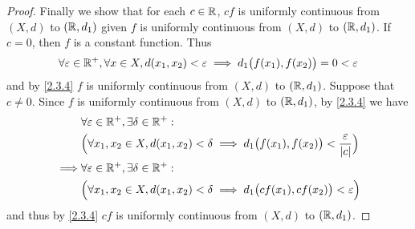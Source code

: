 \begin{proof}
  Finally we show that for each \(c \in \mathbb{R}\), \(cf\) is uniformly continuous from \((X, d)\) to \((\mathbb{R}, d_1)\) given \(f\) is uniformly continuous from \((X, d)\) to \((\mathbb{R}, d_1)\).
  If \(c = 0\), then \(f\) is a constant function.
  Thus
  \[
    \forall \varepsilon \in \mathbb{R}^+, \forall x \in X, d(x_1, x_2) < \varepsilon \implies d_1\big(f(x_1), f(x_2)\big) = 0 < \varepsilon
  \]
  and by \cref{2.3.4} \(f\) is uniformly continuous from \((X, d)\) to \((\mathbb{R}, d_1)\).
  Suppose that \(c \neq 0\).
  Since \(f\) is uniformly continuous from \((X, d)\) to \((\mathbb{R}, d_1)\), by \cref{2.3.4} we have
  \begin{align*}
             & \forall \varepsilon \in \mathbb{R}^+, \exists \delta \in \mathbb{R}^+:                                                                     \\
             & \Big(\forall x_1, x_2 \in X, d(x_1, x_2) < \delta \implies d_1\big(f(x_1), f(x_2)\big) < \dfrac{\varepsilon}{\left\lvert c\right\rvert}\Big) \\
    \implies & \forall \varepsilon \in \mathbb{R}^+, \exists \delta \in \mathbb{R}^+:                                                                     \\
             & \Big(\forall x_1, x_2 \in X, d(x_1, x_2) < \delta \implies d_1\big(cf(x_1), cf(x_2)\big) < \varepsilon\Big)
  \end{align*}
  and thus by \cref{2.3.4} \(cf\) is uniformly continuous from \((X, d)\) to \((\mathbb{R}, d_1)\).
\end{proof}